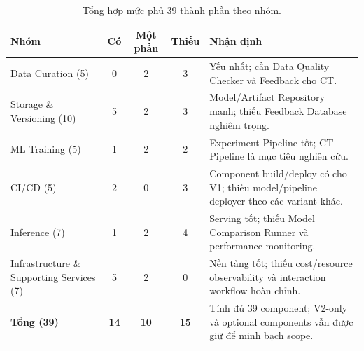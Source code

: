\documentclass[11pt,a4paper]{article}
\begin{document}
\begin{table}[ht]
\centering
\caption{Tổng hợp mức phủ 39 thành phần theo nhóm.}
\begin{tabularx}{\linewidth}{@{}l c c c Y@{}}
\toprule
\textbf{Nhóm} & \textbf{Có} & \textbf{Một phần} & \textbf{Thiếu} & \textbf{Nhận định} \\
\midrule
Data Curation (5) & 0 & 2 & 3 & Yếu nhất; cần Data Quality Checker và Feedback cho CT. \\
Storage \& Versioning (10) & 5 & 2 & 3 & Model/Artifact Repository mạnh; thiếu Feedback Database nghiêm trọng. \\
ML Training (5) & 1 & 2 & 2 & Experiment Pipeline tốt; CT Pipeline là mục tiêu nghiên cứu. \\
CI/CD (5) & 2 & 0 & 3 & Component build/deploy có cho V1; thiếu model/pipeline deployer theo các variant khác. \\
Inference (7) & 1 & 2 & 4 & Serving tốt; thiếu Model Comparison Runner và performance monitoring. \\
Infrastructure \& Supporting Services (7) & 5 & 2 & 0 & Nền tảng tốt; thiếu cost/resource observability và interaction workflow hoàn chỉnh. \\
\midrule
\textbf{Tổng (39)} & \textbf{14} & \textbf{10} & \textbf{15} & Tính đủ 39 component; V2-only và optional components vẫn được giữ để minh bạch scope. \\
\bottomrule
\end{tabularx}
\end{table}
\end{document}

